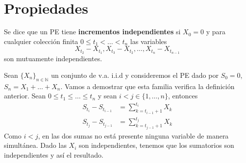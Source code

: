 \documentclass[PREyA.tex]{subfiles}
\begin{document}
\section{Propiedades}
\begin{defi}
Se dice que un PE tiene \textbf{incrementos independientes} si $X_0 = 0$ y para cualquier colección finita $0\leq t_1 < \dotsc < t_n$ las variables
$$
X_{t_2}-X_{t_1}, X_{t_3}-X_{t_2}, \dotsc, X_{t_n}-X_{t_{n-1}}
$$
son mutuamente independientes.
\end{defi}
\begin{example}
Sean $\{X_n\}_{n\in \mathbb{N}}$ un conjunto de v.a. i.i.d y consideremos el PE dado por $S_0 = 0$, $S_n = X_1 + \dotsc + X_n$. Vamos a demostrar que esta familia verifica la definición anterior. Sean $0 \leq t_1 \leq \dotsc \leq t_n$ y sean $i<j \in \{1,\dotsc,n\}$, entonces
\begin{align*}
S_{t_i} - S_{t_{i-1}} &= \sum_{k=t_{i-1}+1}^{t_i} X_k\\
S_{t_j} - S_{t_{j-1}}  &= \sum_{k=t_{j-1}+1}^{t_j} X_k
\end{align*}
Como $i <j$, en las dos sumas no está presente ninguna variable de manera simultánea. Dado las $X_i$ son independientes, tenemos que los sumatorios son independientes y así el resultado.
\end{example}
\end{document}
